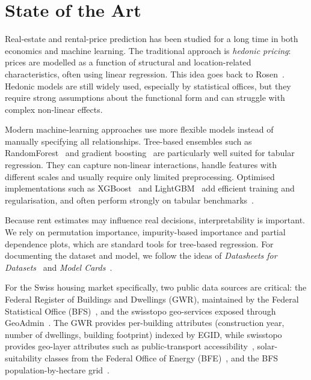 \documentclass[11pt,a4paper]{article}
\begin{document}
\section{State of the Art}
\label{sec:sota}

Real-estate and rental-price prediction has been studied for a long time in both economics and machine learning. The traditional approach is \emph{hedonic pricing}: prices are modelled as a function of structural and location-related characteristics, often using linear regression. This idea goes back to Rosen~\citep{rosen1974hedonic}. Hedonic models are still widely used, especially by statistical offices, but they require strong assumptions about the functional form and can struggle with complex non-linear effects.

Modern machine-learning approaches use more flexible models instead of manually specifying all relationships. Tree-based ensembles such as RandomForest~\citep{breiman2001randomforest} and gradient boosting~\citep{friedman2001gbm} are particularly well suited for tabular regression. They can capture non-linear interactions, handle features with different scales and usually require only limited preprocessing. Optimised implementations such as XGBoost~\citep{chen2016xgboost} and LightGBM~\citep{ke2017lightgbm} add efficient training and regularisation, and often perform strongly on tabular benchmarks~\citep{shwartz2022tabular}.

Because rent estimates may influence real decisions, interpretability is important. We rely on permutation importance, impurity-based importance and partial dependence plots, which are standard tools for tree-based regression. For documenting the dataset and model, we follow the ideas of \emph{Datasheets for Datasets}~\citep{gebru2021datasheets} and \emph{Model Cards}~\citep{mitchell2019modelcards}.

For the Swiss housing market specifically, two public data sources are critical: the Federal Register of Buildings and Dwellings (GWR), maintained by the Federal Statistical Office (BFS)~\citep{bfsGwr}, and the swisstopo geo-services exposed through GeoAdmin~\citep{geoAdminApi}. The GWR provides per-building attributes (construction year, number of dwellings, building footprint) indexed by EGID, while swisstopo provides geo-layer attributes such as public-transport accessibility~\citep{areOevKlassen}, solar-suitability classes from the Federal Office of Energy (BFE)~\citep{bfeSolar}, and the BFS population-by-hectare grid~\citep{bfsPopulation}.
\end{document}
